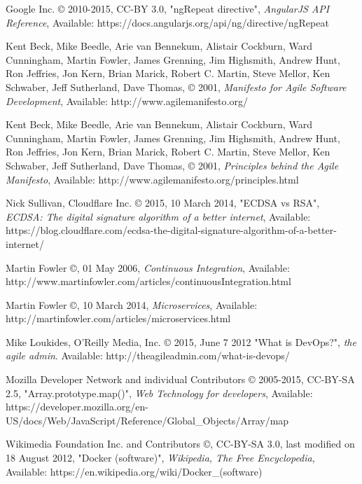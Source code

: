 \begin{thebibliography}{999}
\raggedright
Google Inc. © 2010-2015, CC-BY 3.0, "ngRepeat directive",
{\em AngularJS API Reference},
Available: https://docs.angularjs.org/api/ng/directive/ngRepeat

\raggedright
Kent Beck, Mike Beedle, Arie van Bennekum, Alistair Cockburn, Ward Cunningham,
Martin Fowler, James Grenning, Jim Highsmith, Andrew Hunt, Ron Jeffries, Jon
Kern, Brian Marick, Robert C. Martin, Steve Mellor, Ken Schwaber, Jeff
Sutherland, Dave Thomas, © 2001,
{\em Manifesto for Agile Software Development},
Available: http://www.agilemanifesto.org/

\raggedright
Kent Beck, Mike Beedle, Arie van Bennekum, Alistair Cockburn, Ward Cunningham,
Martin Fowler, James Grenning, Jim Highsmith, Andrew Hunt, Ron Jeffries, Jon
Kern, Brian Marick, Robert C. Martin, Steve Mellor, Ken Schwaber, Jeff
Sutherland, Dave Thomas, © 2001,
{\em Principles behind the Agile Manifesto},
Available: http://www.agilemanifesto.org/principles.html

\raggedright
Nick Sullivan, Cloudflare Inc. © 2015, 10 March 2014, "ECDSA vs RSA",
{\em ECDSA: The digital signature algorithm of a better internet},
Available: https://blog.cloudflare.com/ecdsa-the-digital-signature-algorithm-of-a-better-internet/

\raggedright
Martin Fowler ©, 01 May 2006,
{\em Continuous Integration},
Available: http://www.martinfowler.com/articles/continuousIntegration.html

\raggedright
Martin Fowler ©, 10 March 2014,
{\em Microservices},
Available: http://martinfowler.com/articles/microservices.html

\raggedright
Mike Loukides, O'Reilly Media, Inc. © 2015, June 7 2012
"What is DevOps?",
{\em the agile admin}.
Available: http://theagileadmin.com/what-is-devops/

\raggedright
Mozilla Developer Network and individual Contributors © 2005-2015, CC-BY-SA 2.5, "Array.prototype.map()",
{\em Web Technology for developers},
Available: https://developer.mozilla.org/en-US/docs/Web/JavaScript/Reference/Global\_Objects/Array/map

\raggedright
Wikimedia Foundation Inc. and Contributors ©, CC-BY-SA 3.0,
last modified on 18 August 2012, "Docker (software)",
{\em Wikipedia, The Free Encyclopedia},
Available: https://en.wikipedia.org/wiki/Docker\_(software)

\end{thebibliography}
